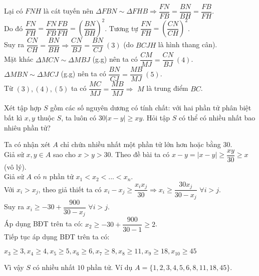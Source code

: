 \begin{ex}
{\begin{itemize}
		\\ Lại có $FNH$ là cát tuyến nên $\Delta FBN \sim \Delta FHB \Rightarrow \dfrac{FN}{FB}=\dfrac{BN}{BH} =\dfrac{FB}{FH}$.
		\\ Do đó $\dfrac{FN}{FH} = \dfrac{FN}{FB}\dfrac{FB}{FH}= \left(\dfrac{BN}{BH}\right)^2$. Tương tự $\dfrac{FN}{FH} = \left(\dfrac{CN}{CH}\right)^2$.
		\\ Suy ra $\dfrac{CN}{CH} = \dfrac{BN}{BH} \Rightarrow \dfrac{CN}{BJ} = \dfrac{BN}{CJ} ~(3)$ (do $BCJH$ là hình thang cân).
		\\ Mặt khác $\Delta MCN \sim \Delta MBJ$ (g.g) nên ta có $\dfrac{CM}{MJ} = \dfrac{CN}{BJ} ~(4)$.
		\\ $\Delta MBN \sim \Delta MCJ$ (g.g) nên ta có $\dfrac{BN}{CJ} =\dfrac{MB}{MJ} ~(5)$.
		\\ Từ $(3),(4),(5)$ ta có $\dfrac{MC}{MJ}=\dfrac{MB}{MJ} \Rightarrow$ $M$ là trung điểm $BC$.
	\end{itemize}
    }
\end{ex}

\begin{ex}%
   Xét tập hợp $S$ gồm các số nguyên dương có tính chất: với hai phần tử phân biệt bất kì $x,y$ thuộc $S$, ta luôn có $30|x-y| \geq xy$. Hỏi tập $S$ có thể có nhiều nhất bao nhiêu phần tử?
\loigiai
    {Ta có nhận xét $A$ chỉ chứa nhiều nhất một phần tử lớn hơn hoặc bằng $30$.
    \\ Giả sử $x,y \in A$ sao cho $x>y>30$. Theo đề bài ta có $x-y=|x-y| \geq \dfrac{xy}{30} \geq x$ (vô lý).
	\\ Giả sử $A$ có $n$ phần tử $x_1 <x_2<...<x_n$.
	\\ Với $x_i > x_j$, theo giả thiết ta có $x_i - x_j \geq \dfrac{x_i x_j}{30} \Rightarrow x_i \geq \dfrac{30x_j}{30-x_j}$ $\forall i>j$.
	\\ Suy ra $x_i \geq -30 +\dfrac{900}{30-x_j}$ $\forall i>j$.
	\\ Áp dụng BĐT trên ta có: $x_2 \geq -30 +\dfrac{900}{30-1} \geq 2$.
	\\ Tiếp tục áp dụng BĐT trên ta có:	
	\begin{center}$
	x_3 \geq 3,	x_4 \geq 4, x_5 \geq 5, x_6 \geq 6, x_7 \geq 8,
	x_8 \geq 11, x_9 \geq 18, x_{10} \geq 45$
	\end{center}
	Vì vậy $S$ có nhiều nhất $10$ phần tử. Ví dụ $A =\{ 1,2,3,4,5,6,8,11,18,45 \}$.
}
\end{ex}



